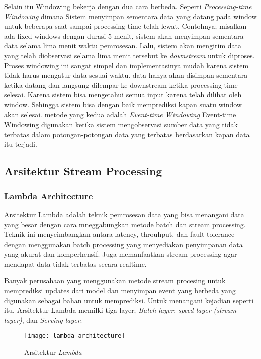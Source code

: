 	Selain itu Windowing bekerja dengan dua cara berbeda. Seperti \textit{Processing-time 
	Windowing} dimana Sistem menyimpan sementara data yang datang pada window untuk beberapa saat 
	sampai processing time telah lewat. Contohnya; misalkan ada fixed windows dengan durasi 5 			
	menit, sistem akan menyimpan sementara data selama lima menit waktu pemrosesan. Lalu, 			 
	sistem akan mengirim data yang telah diobservasi selama lima menit tersebut ke 				 
	\textit{downstream} untuk diproses.\\
	 	
	Proses windowing ini sangat simpel dan implementasinya mudah karena sistem tidak harus 		 
	mengatur data sesuai waktu. data hanya akan disimpan sementara ketika datang dan 				 
	langsung dilempar ke downstream ketika processing time selesai. Karena sistem bisa 			 
	mengetahui semua input karena telah dilihat oleh window. Sehingga sistem bisa dengan 			 
	baik memprediksi kapan suatu window akan selesai. metode yang kedua adalah \textit{Event-time 
	Windowing} Event-time Windowing digunakan ketika sistem mengobservasi sumber data yang tidak 
	terbatas dalam potongan-potongan data yang terbatas berdasarkan kapan data itu terjadi.
	 	
 

\subsection{Arsitektur Stream Processing}

\subsubsection{Lambda Architecture}
Arsitektur Lambda adalah teknik pemrosesan data yang bisa menangani data yang besar dengan cara mneggabungkan metode batch dan stream processing. Teknik ini menyeimbangkan antara latency, throuhput, dan fault-tolerance dengan menggunakan batch processing yang menyediakan penyimpanan data yang akurat dan komperhensif. Juga memanfaatkan stream processing agar mendapat data tidak terbatas secara realtime.

Banyak perusahaan yang menggunakan metode stream procesing untuk memprediksi updates dari model dan menyimpan event yang berbeda yang digunakan sebagai bahan untuk memprediksi. Untuk menangani kejadian seperti itu, Arsitektur Lambda memilki tiga layer; \textit{Batch layer}, \textit{speed layer (stream layer)}, dan \textit{Serving layer}.
	\begin{figure}[H] 
	\centering  
	\texttt{[image: lambda-architecture]}  
	\caption[Gambar Arsitektur { \it Lambda}]{Arsitektur {\it Lambda}} 
	\label{fig:processing-events relationship} 
	\end{figure}
	

